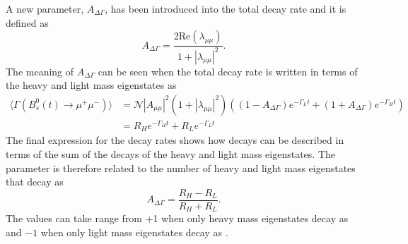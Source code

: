 A new parameter, $A_{\Delta \Gamma}$, has been introduced into the total decay rate and it is defined as
\begin{equation}
A_{\Delta\Gamma} = \frac{2\mathrm{Re}(\lambda_{\mu\mu})}{1 + |\lambda_{\mu\mu}|^2}.
\label{eq:A_DGa}
\end{equation}
The meaning of $A_{\Delta\Gamma}$ can be seen when the total decay rate is written in terms of the heavy and light \bsd mass eigenstates as
\begin{align}
  \langle\Gamma (B^0_s(t) \to \mu^+ \mu^-) \rangle &= \mathcal{N} |A_{\mu\mu}|^2 (1 + |\lambda_{\mu\mu}|^2) \left( (1 - A_{\Delta\Gamma})e^{-\Gamma_L t} + (1 + A_{\Delta\Gamma})e^{-\Gamma_{H} t} \right) \nonumber \\
&= R_H e^{-\Gamma_H t} + R_L e^{-\Gamma_L t}
\label{eq:decayratesC}
\end{align}
The final expression for the decay rates shows how \bmumu decays can be described in terms of the sum of the decays of the heavy and light mass eigenstates. The parameter \ADG is therefore related to the number of heavy and light mass eigenstates that decay as
\begin{equation}
A_{\Delta\Gamma} = \frac{R_H - R_L}{R_H + R_L}.
\end{equation}
The values \ADG can take range from +1 when only heavy mass eigenstates decay as \bsmumu and $-1$ when only light mass eigenstates decay as \bsmumu.
